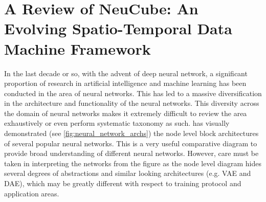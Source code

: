 
\chapter{A Review of NeuCube: An Evolving Spatio-Temporal Data Machine Framework} %

\label{chap:neucube} %


In the last decade or so, with the advent of deep neural network, a significant proportion of research in artificial intelligence and machine learning has been conducted in the area of neural networks. This has led to a massive diversification in the architecture and functionality of the neural networks. This diversity across the domain of neural networks makes it extremely difficult to review the area exhaustively or even perform systematic taxonomy as such. \citet{neuralnetworkzoo} has visually demonstrated (see \figurename \ref{fig:neural_network_archs}) the node level block architectures of several popular neural networks. This is a very useful comparative diagram to provide broad understanding of different neural networks. However, care must be taken in interpreting the networks from the figure as the node level diagram hides several degrees of abstractions and similar looking architectures (e.g. VAE and DAE), which may be greatly different with respect to training protocol and application areas. 
